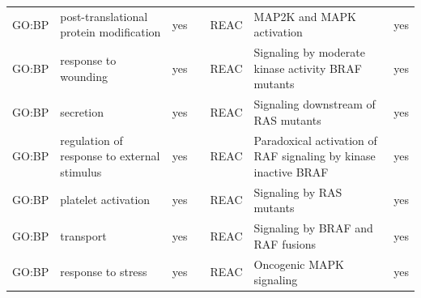 \begin{longtable}{@{}lp{4cm}lllp{4cm}l@{}}
GO:BP           & post-translational protein modification                                                                                            & yes              &           & REAC            & MAP2K and MAPK activation                                                                                                                                              & yes              \\
GO:BP           & response to wounding                                                                                                               & yes              &           & REAC            & Signaling by moderate kinase activity BRAF mutants                                                                                                                     & yes              \\
GO:BP           & secretion                                                                                                                          & yes              &           & REAC            & Signaling downstream of RAS mutants                                                                                                                                    & yes              \\
GO:BP           & regulation of response to external stimulus                                                                                        & yes              &           & REAC            & Paradoxical activation of RAF signaling by kinase inactive BRAF                                                                                                        & yes              \\
GO:BP           & platelet activation                                                                                                                & yes              &           & REAC            & Signaling by RAS mutants                                                                                                                                               & yes              \\
GO:BP           & transport                                                                                                                          & yes              &           & REAC            & Signaling by BRAF and RAF fusions                                                                                                                                      & yes              \\
GO:BP           & response to stress                                                                                                                 & yes              &           & REAC            & Oncogenic MAPK signaling                                                                                                                                               & yes              \\

\end{longtable}
